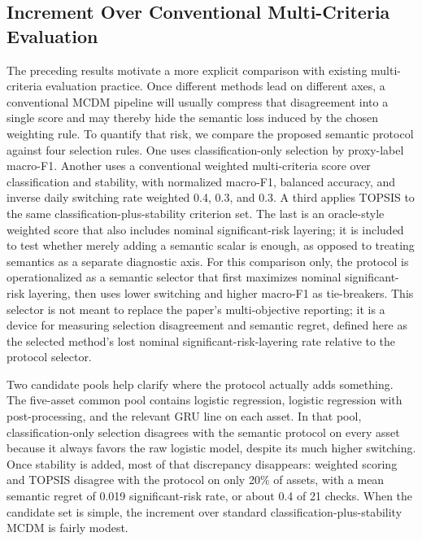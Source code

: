 \documentclass[a4paper,fleqn]{cas-dc}
\begin{document}
\subsection{Increment Over Conventional Multi-Criteria Evaluation}
\label{sec:framework-increment}
The preceding results motivate a more explicit comparison with existing multi-criteria evaluation practice. Once different methods lead on different axes, a conventional MCDM pipeline will usually compress that disagreement into a single score and may thereby hide the semantic loss induced by the chosen weighting rule. To quantify that risk, we compare the proposed semantic protocol against four selection rules. One uses classification-only selection by proxy-label macro-F1. Another uses a conventional weighted multi-criteria score over classification and stability, with normalized macro-F1, balanced accuracy, and inverse daily switching rate weighted 0.4, 0.3, and 0.3. A third applies TOPSIS to the same classification-plus-stability criterion set. The last is an oracle-style weighted score that also includes nominal significant-risk layering; it is included to test whether merely adding a semantic scalar is enough, as opposed to treating semantics as a separate diagnostic axis. For this comparison only, the protocol is operationalized as a semantic selector that first maximizes nominal significant-risk layering, then uses lower switching and higher macro-F1 as tie-breakers. This selector is not meant to replace the paper's multi-objective reporting; it is a device for measuring selection disagreement and semantic regret, defined here as the selected method's lost nominal significant-risk-layering rate relative to the protocol selector.

Two candidate pools help clarify where the protocol actually adds something. The five-asset common pool contains logistic regression, logistic regression with post-processing, and the relevant GRU line on each asset. In that pool, classification-only selection disagrees with the semantic protocol on every asset because it always favors the raw logistic model, despite its much higher switching. Once stability is added, most of that discrepancy disappears: weighted scoring and TOPSIS disagree with the protocol on only 20\% of assets, with a mean semantic regret of 0.019 significant-risk rate, or about 0.4 of 21 checks. When the candidate set is simple, the increment over standard classification-plus-stability MCDM is fairly modest.
\end{document}
